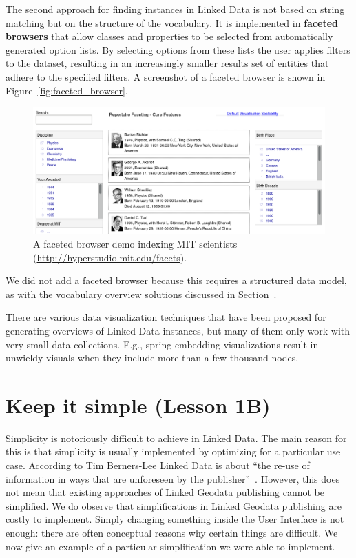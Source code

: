 \documentclass[a4paper]{scrartcl}
\begin{document}
The second approach for finding instances in Linked Data is not based
on string matching but on the structure of the vocabulary.  It is
implemented in \textbf{faceted browsers} that allow classes and
properties to be selected from automatically generated option lists.
By selecting options from these lists the user applies filters to the
dataset, resulting in an increasingly smaller results set of entities
that adhere to the specified filters.  A screenshot of a faceted
browser is shown in Figure~\ref{fig:faceted_browser}.

\begin{figure}
  \includegraphics[width=\linewidth]{img/faceted_browser}
  \caption{A faceted browser demo indexing MIT scientists
    (\url{http://hyperstudio.mit.edu/facets}).}
  \label{fig:search}
\end{figure}

We did not add a faceted browser because this requires a structured
data model, as with the vocabulary overview solutions discussed in
Section~\label{sec:vocabulary_overview}.

There are various data visualization techniques that have been
proposed for generating overviews of Linked Data instances, but many
of them only work with very small data collections.  E.g., spring
embedding visualizations result in unwieldy visuals when they include
more than a few thousand nodes.



\section{Keep it simple (Lesson 1B)}

Simplicity is notoriously difficult to achieve in Linked Data.  The
main reason for this is that simplicity is usually implemented by
optimizing for a particular use case.  According to Tim Berners-Lee
Linked Data is about ``the re-use of information in ways that are
unforeseen by the publisher''~\cite{Bernerslee2006}.  However, this
does not mean that existing approaches of Linked Geodata publishing
cannot be simplified.  We do observe that simplifications in Linked
Geodata publishing are costly to implement.  Simply changing something
inside the User Interface is not enough: there are often conceptual
reasons why certain things are difficult.  We now give an example of a
particular simplification we were able to implement.
\end{document}
